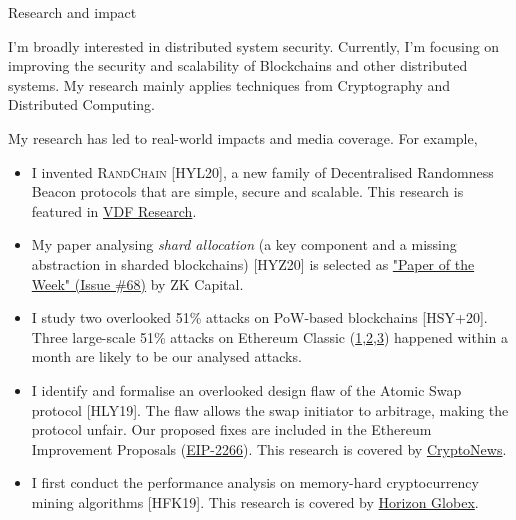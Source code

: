 \documentclass{resume} %
\begin{document}
\begin{rSection}{Research and impact}

I'm broadly interested in distributed system security.
Currently, I'm focusing on improving the security and scalability of Blockchains and other distributed systems.
My research mainly applies techniques from Cryptography and Distributed Computing.

My research has led to real-world impacts and media coverage. For example,
\begin{itemize}
    \item I invented \textsc{RandChain} [HYL20], a new family of Decentralised Randomness Beacon protocols that are simple, secure and scalable. This research  is featured in \href{https://vdfresearch.org/}{VDF Research}.
    \item My paper analysing \emph{shard allocation} (a key component and a missing abstraction in sharded blockchains) [HYZ20] is selected as \href{https://zkcapital.substack.com/}{"Paper of the Week" (Issue \#68)} by ZK Capital.
    \item I study two overlooked 51\% attacks on PoW-based blockchains [HSY+20]. Three large-scale 51\% attacks on Ethereum Classic (\href{https://news.bitcoin.com/ethereum-classic-suffers-51-attack-again-delisting-risk-amplified}{1},\href{https://decrypt.co/40196/hackers-launch-third-51-attack-on-ethereum-classic-this-month}{2},\href{https://coingeek.com/over-1m-double-spent-in-latest-ethereum-classic-51-attack}{3}) happened within a month are likely to be our analysed attacks.
    \item I identify and formalise an overlooked design flaw of the Atomic Swap protocol [HLY19]. The flaw allows the swap initiator to arbitrage, making the protocol unfair. Our proposed fixes are included in the Ethereum Improvement Proposals (\href{https://github.com/ethereum/EIPs/issues/2266}{EIP-2266}). This research is covered by \href{https://cryptonews.com.au/monash-university-researchers-developing-cryptocurrency-transaction-platform}{CryptoNews}.
    \item I first conduct the performance analysis on memory-hard cryptocurrency mining algorithms [HFK19]. This research is covered by \href{https://medium.com/@horizonfintex/blockchain-research-bytes-1-9d023e080765}{Horizon Globex}.
\end{itemize}

\end{rSection}
\end{document}
